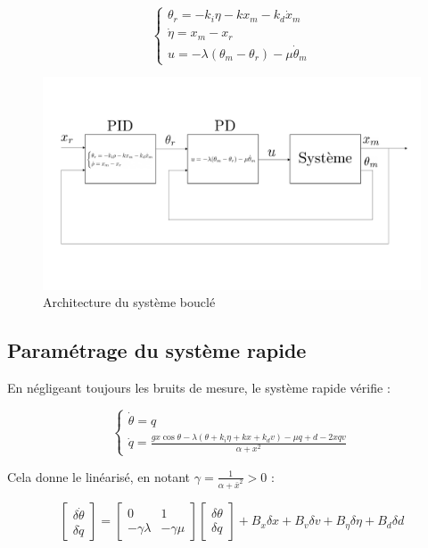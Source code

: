 \documentclass[10pt]{article}
\begin{document}
\[
	\begin{cases}
		\theta_r = - k_i \eta - k x_m - k_d \dot x_m \\
		\dot \eta = x_m - x_r \\
		u = - \lambda ( \theta_m - \theta_r ) - \mu \dot \theta_m
	\end{cases}
\]

\begin{figure}[H]
	\centering
	\includegraphics[width=\linewidth]{schemaPD+PID.pdf}
	\caption{Architecture du système bouclé}
\end{figure}

\subsection*{Paramétrage du système rapide}

\noindent En négligeant toujours les bruits de mesure, le système rapide vérifie :

\[
	\begin{cases}
		\dot \theta = q \\
		\dot q =
		\frac{gx \cos \theta - \lambda ( \theta + k_i \eta + k x + k_d v ) - \mu q + d - 2xqv}{\alpha + x^2}
	\end{cases}
\]

\noindent Cela donne le linéarisé, en notant $\gamma = \frac{1}{\alpha + \bar x^2} > 0$ :

\[
	\begin{bmatrix}
		\delta \dot \theta \\
		\delta \dot q
	\end{bmatrix}
	=\begin{bmatrix}
		0 & 1 \\
		- \gamma \lambda & - \gamma \mu
	\end{bmatrix}
	\begin{bmatrix}
		\delta \theta \\
		\delta q
	\end{bmatrix} +
	B_x \delta x +
	B_v \delta v +
	B_\eta \delta \eta +
	B_d \delta d
\]
\end{document}
